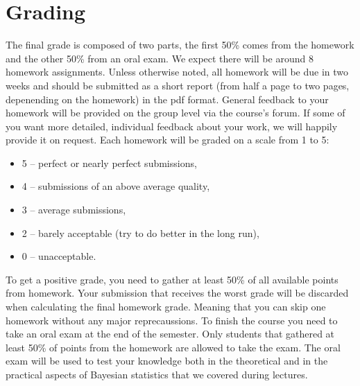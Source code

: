 \documentclass[fleqn,moreauthors,10pt]{ds_report}
\begin{document}
\flushbottom

\maketitle

\thispagestyle{empty} 



\section*{Grading}

The final grade is composed of two parts, the first 50\% comes from the homework and the other 50\% from an oral exam. We expect there will be around 8 homework assignments. Unless otherwise noted, all homework will be due in two weeks and should be submitted as a short report (from half a page to two pages, depenending on the homework) in the pdf format. General feedback to your homework will be provided on the group level via the course's forum. If some of you want more detailed, individual feedback about your work, we will happily provide it on request. Each homework will be graded on a scale from 1 to 5:

\begin{itemize}
	\item 5 -- perfect or nearly perfect submissions,
	\item 4 -- submissions of an above average quality,
	\item 3 -- average submissions,
	\item 2 -- barely acceptable (try to do better in the long run),
	\item 0 -- unacceptable.
\end{itemize}

To get a positive grade, you need to gather at least 50\% of all available points from homework. Your submission that receives the worst grade will be discarded when calculating the final homework grade. Meaning that you can skip one homework without any major reprecaussions. To finish the course you need to take an oral exam at the end of the semester. Only students that gathered at least 50\% of points from the homework are allowed to take the exam. The oral exam will be used to test your knowledge both in the theoretical and in the practical aspects of Bayesian statistics that we covered during lectures.
\end{document}

